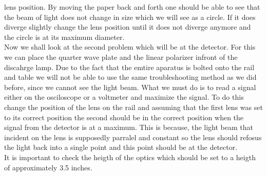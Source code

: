 \documentclass[twocolumn]{article}
\begin{document}
\begin{enumerate}[label=\alph*).]
lens position. By moving the paper back and forth one should be able to see 
that the beam of light does not change in size which we will see as a circle. 
If it does diverge slightly change the lens position until it does not 
diverge anymore and the circle is at its maximum diameter.
\\
Now we shall look at the second problem which will be at the detector. For this 
we can place the quarter wave plate and the linear polarizer infront of the 
discahrge lamp. Due 
to the fact that the emtire aparatus is bolted onto the rail and table we will 
not be able to use the same troubleshooting method as we did before, since we 
cannot see the light beam. What we 
must do is to read a signal either on the osciloscope or a voltmeter and 
maximize the signal. To do this change the position of the lens on the rail and assuming that the first lens was set to its correct position the second should 
be in the correct position when the signal from the detector is at a maximum. 
This is because, the light beam that incident on the lens is supposedly 
parralel and constant so the lens should refosus the light back into a single 
point and this point should be at the detector.
\\
It is important to check the heigth of the optics which should be set to a 
heigth of approximately 3.5 inches.
\end{enumerate}
\end{document}
